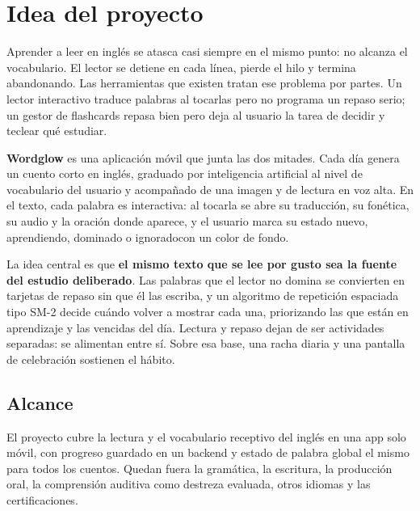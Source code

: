 \documentclass[letterpaper]{wordglow}
\begin{document}
\maketitle

\wgindice
\clearpage
{}

\section{Idea del proyecto}

Aprender a leer en ingl\'es se atasca casi siempre en el mismo punto: no
alcanza el vocabulario. El lector se detiene en cada l\'inea, pierde el
hilo y termina abandonando. Las herramientas que existen tratan ese
problema por partes. Un lector interactivo traduce palabras al tocarlas
pero no programa un repaso serio; un gestor de flashcards repasa bien
pero deja al usuario la tarea de decidir y teclear qu\'e estudiar.

\textbf{Wordglow} es una aplicaci\'on m\'ovil que junta las dos mitades. Cada
d\'ia genera un cuento corto en ingl\'es, graduado por inteligencia
artificial al nivel de vocabulario del usuario y acompa\~nado de una
imagen y de lectura en voz alta. En el texto, cada palabra es
interactiva: al tocarla se abre su traducci\'on, su fon\'etica, su audio y
la oraci\'on donde aparece, y el usuario marca su estado \textemdash nuevo,
aprendiendo, dominado o ignorado\textemdash con un color de fondo.

La idea central es que \textbf{el mismo texto que se lee por gusto sea la
fuente del estudio deliberado}. Las palabras que el lector no domina se
convierten en tarjetas de repaso sin que \'el las escriba, y un algoritmo
de repetici\'on espaciada tipo SM-2 decide cu\'ando volver a mostrar cada
una, priorizando las que est\'an en aprendizaje y las vencidas del d\'ia.
Lectura y repaso dejan de ser actividades separadas: se alimentan entre
s\'i. Sobre esa base, una racha diaria y una pantalla de celebraci\'on
sostienen el h\'abito.

\subsection{Alcance}

El proyecto cubre la lectura y el vocabulario receptivo del ingl\'es en
una app solo m\'ovil, con progreso guardado en un backend y estado de
palabra global \textemdash el mismo para todos los cuentos\textemdash. Quedan
fuera la gram\'atica, la escritura, la producci\'on oral, la comprensi\'on
auditiva como destreza evaluada, otros idiomas y las certificaciones.
\end{document}
